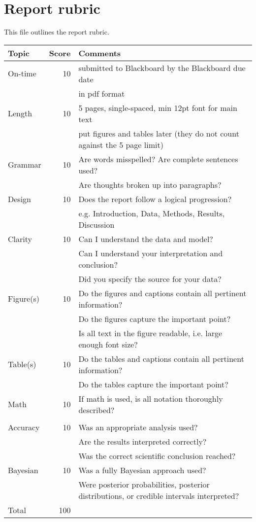 \documentclass[10pt]{article}
\begin{document}
\chead[\fancyplain{} {}]   {\fancyplain{}{}}

\section*{Report rubric}

This file outlines the report rubric.

\begin{tabular}{|l|r|l|}
\hline
Topic & \multicolumn{1}{l|}{Score} & Comments \\
\hline
On-time   & 10 & submitted to Blackboard by the Blackboard due date \\
&& in pdf format \\
\hline
Length & 10 & 5 pages, single-spaced, min 12pt font for main text \\ 
&& put figures and tables later (they do not count against the 5 page limit) \\
\hline
Grammar & 10 & Are words misspelled? Are complete sentences used?\\
&& Are thoughts broken up into paragraphs? \\
\hline
Design & 10 & Does the report follow a logical progression? \\
&& e.g. Introduction, Data, Methods, Results, Discussion \\
\hline 
Clarity & 10 & Can I understand the data and model? \\
&& Can I understand your interpretation and conclusion? \\
&& Did you specify the source for your data? \\
\hline
Figure(s) & 10 & Do the figures and captions contain all pertinent information? \\
&& Do the figures capture the important point? \\
&& Is all text in the figure readable, i.e. large enough font size? \\
\hline
Table(s) & 10 & Do the tables and captions contain all pertinent information? \\
&& Do the tables capture the important point? \\
\hline
Math & 10 & If math is used, is all notation thoroughly described? \\ &&\\
\hline
Accuracy & 10 & Was an appropriate analysis used? \\
&& Are the results interpreted correctly? \\
&& Was the correct scientific conclusion reached? \\
\hline
Bayesian & 10 & Was a fully Bayesian approach used? \\
&& Were posterior probabilities, posterior distributions, or credible intervals interpreted? \\
\hline
Total &100 &\\
\hline
\end{tabular}
\end{document}
